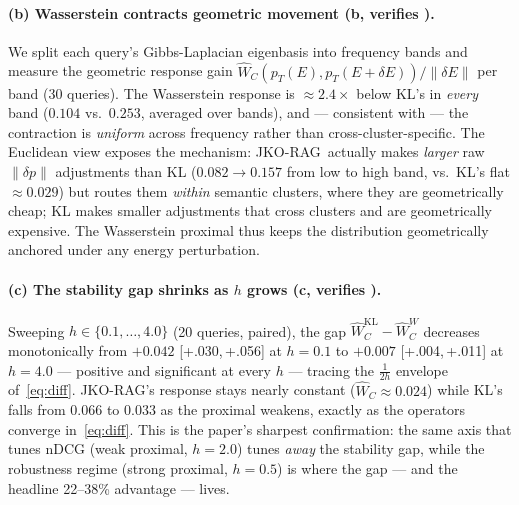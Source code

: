\documentclass{article}
\theoremstyle{plain}
\newcommand{\mWdist}{\widehat{W}_C}
\newcommand{\jko}{\textsc{JKO-RAG}}
\newcommand{\CI}[2]{[#1,\,#2]}
\begin{document}
\paragraph{(b) Wasserstein contracts geometric movement (b, verifies ).}
We split each query's Gibbs-Laplacian eigenbasis into frequency bands and measure the geometric response gain $\mWdist(p_T(E),p_T(E{+}\delta E))/\|\delta E\|$ per band (30 queries). The Wasserstein response is ${\approx}2.4\times$ below KL's in \emph{every} band ($0.104$ vs.\ $0.253$, averaged over bands), and --- consistent with  --- the contraction is \emph{uniform} across frequency rather than cross-cluster-specific. The Euclidean view exposes the mechanism: \jko\ actually makes \emph{larger} raw $\|\delta p\|$ adjustments than KL ($0.082\!\to\!0.157$ from low to high band, vs.\ KL's flat ${\approx}0.029$) but routes them \emph{within} semantic clusters, where they are geometrically cheap; KL makes smaller adjustments that cross clusters and are geometrically expensive. The Wasserstein proximal thus keeps the distribution geometrically anchored under any energy perturbation.

\paragraph{(c) The stability gap shrinks as $h$ grows (c, verifies ).}
Sweeping $h\in\{0.1,\dots,4.0\}$ (20 queries, paired), the gap $\mWdist^{\mathrm{KL}}-\mWdist^{W}$ decreases monotonically from $+0.042$ \CI{+.030}{+.056} at $h{=}0.1$ to $+0.007$ \CI{+.004}{+.011} at $h{=}4.0$ --- positive and significant at every $h$ --- tracing the $\tfrac{1}{2h}$ envelope of~\eqref{eq:diff}. \jko's response stays nearly constant ($\mWdist{\approx}0.024$) while KL's falls from $0.066$ to $0.033$ as the proximal weakens, exactly as the operators converge in~\eqref{eq:diff}. This is the paper's sharpest confirmation: the same axis that tunes nDCG (weak proximal, $h{=}2.0$) tunes \emph{away} the stability gap, while the robustness regime (strong proximal, $h{=}0.5$) is where the gap --- and the headline 22--38\% advantage --- lives.
\end{document}
